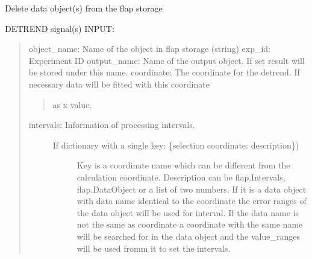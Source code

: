 \documentclass[letterpaper,10pt,english]{sphinxmanual}
\begin{document}

\begin{fulllineitems}
\label{\detokenize{data_object:flap.data_object.delete_data_object}}
Delete data object(s) from the flap storage

\end{fulllineitems}


\begin{fulllineitems}
\label{\detokenize{data_object:flap.data_object.detrend}}
DETREND signal(s)
INPUT:
\begin{quote}

object\_name: Name of the object in flap storage (string)
exp\_id: Experiment ID
output\_name: Name of the output object. If set result will be  stored under this name.
coordinate: The coordinate for the detrend. If necessary data will be fitted with this coordinate
\begin{quote}

as x value.
\end{quote}
\begin{description}
\item[{intervals: Information of processing intervals.}] \leavevmode\begin{description}
\item[{If dictionary with a single key: \{selection coordinate: description\})}] \leavevmode
Key is a coordinate name which can be different from the calculation
coordinate.
Description can be flap.Intervals, flap.DataObject or
a list of two numbers. If it is a data object with data name identical to
the coordinate the error ranges of the data object will be used for
interval. If the data name is not the same as coordinate a coordinate with the
same name will be searched for in the data object and the value\_ranges
will be used fromm it to set the intervals.


\end{description}
\end{description}
\end{quote}
\end{fulllineitems}
\end{document}

